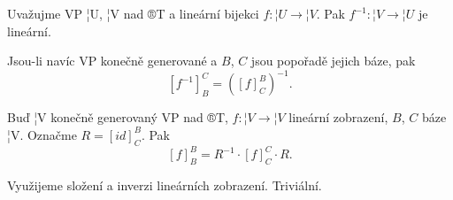 \documentclass[12pt]{article}					%
\begin{document}
    \begin{tvrzeni}
        Uvažujme VP ¦U, ¦V nad ®T a lineární bijekci $f: ¦U \rightarrow ¦V$. Pak $f^{-1}: ¦V \rightarrow ¦U$ je lineární.

        Jsou-li navíc VP konečně generované a $B$, $C$ jsou popořadě jejich báze, pak
        $$ [f^{-1}]_B^C = ([f]_C^B)^{-1}. $$ 
    \end{tvrzeni}

    \begin{tvrzeni}
        Buď ¦V konečně generovaný VP nad ®T, $f: ¦V \rightarrow ¦V$ lineární zobrazení, $B$, $C$ báze ¦V. Označme $R = [id]_C^B$. Pak
        $$ [f]_B^B = R^{-1}·[f]_C^C · R. $$
        \begin{dukazin}
            Využijeme složení a inverzi lineárních zobrazení. Triviální.
        \end{dukazin}
    \end{tvrzeni}
\end{document}
